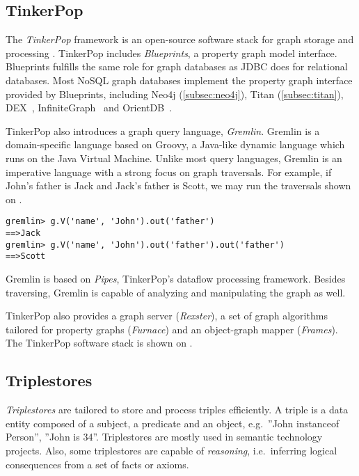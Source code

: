 \subsection{TinkerPop}

The \textit{TinkerPop} framework is an open-source software stack for graph storage and processing \cite{TinkerPop}. TinkerPop includes \textit{Blueprints}, a property graph model interface. Blueprints fulfills the same role for graph databases as JDBC does for relational databases. Most NoSQL graph databases implement the property graph interface provided by Blueprints, including Neo4j (\autoref{subsec:neo4j}), Titan (\autoref{subsec:titan}), DEX~\cite{DEX}, InfiniteGraph~\cite{InfiniteGraph} and OrientDB~\cite{OrientDB}.

 
TinkerPop also introduces a graph query language, \textit{Gremlin}. Gremlin is a domain-specific language based on Groovy, a Java-like dynamic language which runs on the Java Virtual Machine. Unlike most query languages, Gremlin is an imperative language with a strong focus on graph traversals. For example, if John's father is Jack and Jack's father is Scott, we may run the traversals shown on .

\begin{lstlisting}[caption=Simple Gremlin queries, label=lst:gremlin-queries]
gremlin> g.V('name', 'John').out('father')
==>Jack
gremlin> g.V('name', 'John').out('father').out('father')
==>Scott
\end{lstlisting}


Gremlin is based on \textit{Pipes}, TinkerPop's dataflow processing framework. Besides traversing, Gremlin is capable of analyzing and manipulating the graph as well.

TinkerPop also provides a graph server (\textit{Rexster}), a set of graph algorithms tailored for property graphs (\textit{Furnace}) and an object-graph mapper (\textit{Frames}). The TinkerPop software stack is shown on .


\subsection{Triplestores}

\textit{Triplestores} are tailored to store and process triples efficiently. A triple is a data entity composed of a subject, a predicate and an object, e.g.\ ''John instanceof Person'', ''John is 34''. Triplestores are mostly used in semantic technology projects. Also, some triplestores are capable of \emph{reasoning}, i.e.\ inferring logical consequences from a set of facts or axioms. 


